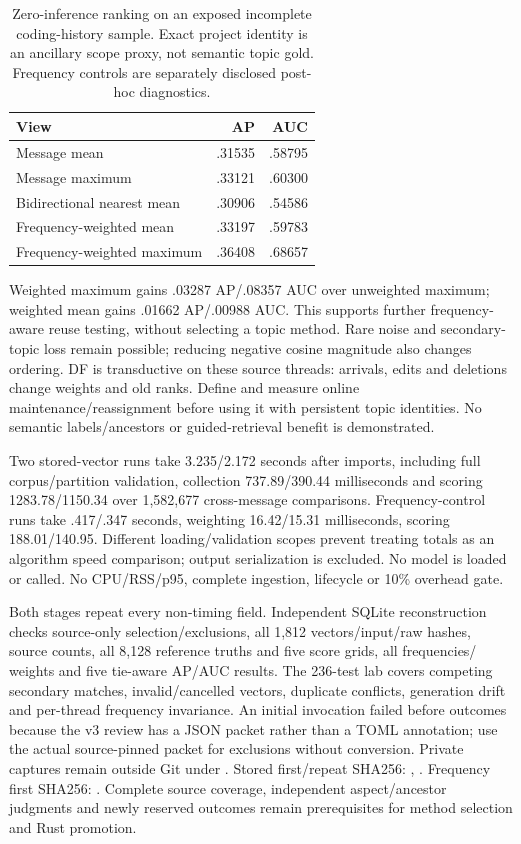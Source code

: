 \documentclass[11pt]{article}
\begin{document}
\begin{table}[ht]
\centering\small
\begin{tabular}{lrr}
\toprule
View & AP & AUC\\
\midrule
Message mean & .31535 & .58795\\
Message maximum & .33121 & .60300\\
Bidirectional nearest mean & .30906 & .54586\\
Frequency-weighted mean & .33197 & .59783\\
Frequency-weighted maximum & .36408 & .68657\\
\bottomrule
\end{tabular}
\caption{Zero-inference ranking on an exposed incomplete coding-history sample.
Exact project identity is an ancillary scope proxy, not semantic topic gold.
Frequency controls are separately disclosed post-hoc diagnostics.}
\end{table}

Weighted maximum gains .03287 AP/.08357 AUC over unweighted maximum; weighted
mean gains .01662 AP/.00988 AUC. This supports further frequency-aware reuse
testing, without selecting a topic method. Rare noise and secondary-topic loss
remain possible; reducing negative cosine magnitude also changes ordering.
DF is transductive on these source threads: arrivals, edits and deletions change
weights and old ranks. Define and measure online maintenance/reassignment before
using it with persistent topic identities. No semantic labels/ancestors or
guided-retrieval benefit is demonstrated.

Two stored-vector runs take 3.235/2.172 seconds after imports, including full
corpus/partition validation, collection 737.89/390.44 milliseconds and scoring
1283.78/1150.34 over 1,582,677 cross-message comparisons. Frequency-control runs
take .417/.347 seconds, weighting 16.42/15.31 milliseconds, scoring 188.01/140.95.
Different loading/validation scopes prevent treating totals as an algorithm
speed comparison; output serialization is excluded. No model is loaded or
called. No CPU/RSS/p95, complete ingestion, lifecycle or 10\% overhead gate.

Both stages repeat every non-timing field. Independent SQLite reconstruction
checks source-only selection/exclusions, all 1,812 vectors/input/raw hashes,
source counts, all 8,128 reference truths and five score grids, all frequencies/
weights and five tie-aware AP/AUC results. The 236-test lab covers competing
secondary matches, invalid/cancelled vectors, duplicate conflicts, generation
drift and per-thread frequency invariance. An initial invocation failed before
outcomes because the v3 review has a JSON packet rather than a TOML annotation;
use the actual source-pinned packet for exclusions without conversion.
Private captures remain outside Git under .
Stored first/repeat SHA256:
,
.
Frequency first SHA256:
.
Complete source coverage, independent aspect/ancestor judgments and newly
reserved outcomes remain prerequisites for method selection and Rust promotion.
\end{document}
